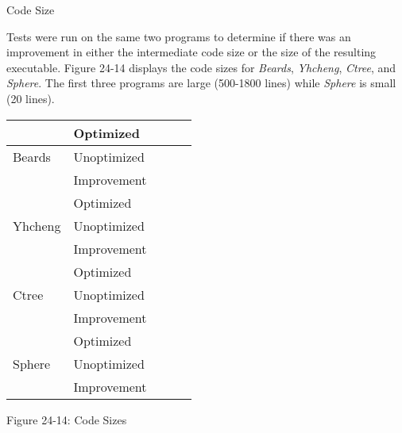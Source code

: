 {\sffamily
Code Size}

Tests were run on the same two programs to determine if there was an
improvement in either the intermediate code size or the size of the
resulting executable. Figure 24-14 displays the code sizes for
\textit{Beards}, \textit{Yhcheng}, \textit{Ctree}, and
\textit{Sphere}. The first three programs are large (500-1800 lines)
while \textit{Sphere} is small (20 lines).

\begin{center}
\tabletail{}
\tablelasttail{}
\begin{xtabular}{|m{1.1212599in}|m{1.1212599in}|m{1.1212599in}|m{1.1212599in}|m{1.1212599in}|}
\hline
~
 &
 Optimized &
 &
 &
\raggedleft{}\\\hline
 Beards &
 Unoptimized &
 &
 &
\raggedleft{}\\\hline
~
 &
 Improvement &
 &
 &
\raggedleft{}\\\hline
~
 &
 Optimized &
 &
 &
\raggedleft{}\\\hline
 Yhcheng &
 Unoptimized &
 &
 &
\raggedleft{}\\\hline
~
 &
 Improvement &
 &
 &
\raggedleft{}\\\hline
~
 &
 Optimized &
 &
 &
\raggedleft{}\\\hline
 Ctree &
 Unoptimized &
 &
 &
\raggedleft{}\\\hline
~
 &
 Improvement &
 &
 &
\raggedleft{}\\\hline
~
 &
 Optimized &
 &
 &
\raggedleft{}\\\hline
 Sphere &
 Unoptimized &
 &
 &
\raggedleft{}\\\hline
~
 &
 Improvement &
 &
 &
\raggedleft{}\\\hline
\end{xtabular}
\end{center}
{\centering{}
Figure 24-14: Code Sizes
\par}


